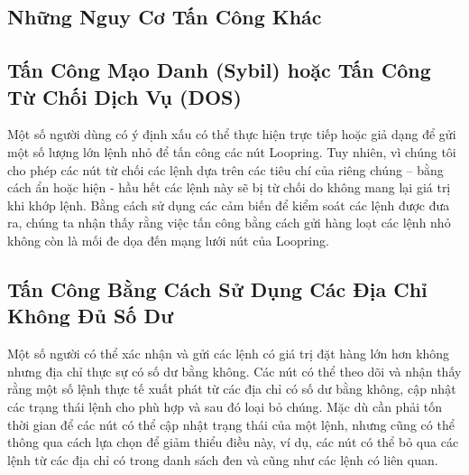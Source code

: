 \documentclass{article}
\begin{document}
\begin{multicols}{2}
\section{Những Nguy Cơ Tấn Công Khác}
\subsection{Tấn Công Mạo Danh (Sybil) hoặc Tấn Công Từ Chối Dịch Vụ (DOS)}
Một số người dùng có ý định xấu có thể thực hiện trực tiếp hoặc giả dạng để gửi một số lượng lớn lệnh nhỏ để tấn công các nút Loopring. Tuy nhiên, vì chúng tôi cho phép các nút từ chối các lệnh dựa trên các tiêu chí của riêng chúng – bằng cách ẩn hoặc hiện - hầu hết các lệnh này sẽ bị từ chối do không mang lại giá trị khi khớp lệnh. Bằng cách sử dụng các cảm biến để kiểm soát các lệnh được đưa ra, chúng ta nhận thấy rằng việc tấn công bằng cách gửi hàng loạt các lệnh nhỏ không còn là mối đe dọa đến mạng lưới nút của Loopring.
\subsection{Tấn Công Bằng Cách Sử Dụng Các Địa Chỉ Không Đủ Số Dư}
Một số người có thể xác nhận và gửi các lệnh có giá trị đặt hàng lớn hơn không nhưng địa chỉ thực sự có số dư bằng không. Các nút có thể theo dõi và nhận thấy rằng một số lệnh thực tế xuất phát từ các địa chỉ có số dư bằng không, cập nhật các trạng thái lệnh cho phù hợp và sau đó loại bỏ chúng. Mặc dù cần phải tốn thời gian để các nút có thể cập nhật trạng thái của một lệnh, nhưng cũng có thể thông qua cách lựa chọn để giảm thiểu điều này, ví dụ, các nút có thể bỏ qua các lệnh từ các địa chỉ có trong danh sách đen và cũng như các lệnh có liên quan.

\end{multicols}
\end{document}
